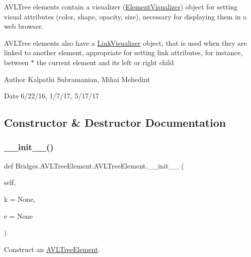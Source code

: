 A\+V\+L\+Tree elements contain a visualizer (\mbox{\hyperlink{namespace_bridges_1_1_element_visualizer}{Element\+Visualizer}}) object for setting visual attributes (color, shape, opacity, size), necessary for displaying them in a web browser.

A\+V\+L\+Tree elements also have a \mbox{\hyperlink{namespace_bridges_1_1_link_visualizer}{Link\+Visualizer}} object, that is used when they are linked to another element, appropriate for setting link attributes, for instance, between $\ast$ the current element and its left or right child

\begin{DoxyAuthor}{Author}
Kalpathi Subramanian, Mihai Mehedint
\end{DoxyAuthor}
\begin{DoxyDate}{Date}
6/22/16, 1/7/17, 5/17/17 
\end{DoxyDate}


\subsection{Constructor \& Destructor Documentation}
\mbox{\label{class_bridges_1_1_a_v_l_tree_element_1_1_a_v_l_tree_element_abe1f188885a526cdaca8eb37d51ca8eb}} 
\subsubsection{\texorpdfstring{\+\_\+\+\_\+init\+\_\+\+\_\+()}{\_\_init\_\_()}}
{\footnotesize\ttfamily def Bridges.\+A\+V\+L\+Tree\+Element.\+A\+V\+L\+Tree\+Element.\+\_\+\+\_\+init\+\_\+\+\_\+ (\begin{DoxyParamCaption}\item[{}]{self,  }\item[{}]{k = {\ttfamily None},  }\item[{}]{e = {\ttfamily None} }\end{DoxyParamCaption})}



Construct an \mbox{\hyperlink{class_bridges_1_1_a_v_l_tree_element_1_1_a_v_l_tree_element}{A\+V\+L\+Tree\+Element}}. 


